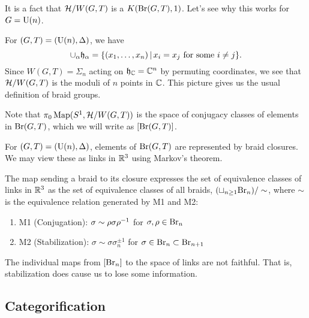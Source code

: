 It is a fact that $\mathcal{H} / W(G, T)$ is a $K(\mathrm{Br}(G, T), 1)$.
Let's see why this works for $G = \mathrm{U}(n)$.

\begin{ex}
	For $(G, T) = (\mathrm{U}(n), \Delta)$, we have
	\[
		\cup_\alpha \mathfrak{h}_\alpha = \{ (x_1, \dots, x_n ) \, | \, x_i = x_j \textrm{ for some } i \neq j \}.
	\]
	Since $W(G, T) = \Sigma_n$ acting on $\mathfrak{h}_{\mathbb{C}} = \mathbb{C}^n$ by permuting coordinates, we see that $\mathcal{H} / W(G, T)$ is the moduli of $n$ points in $\mathbb{C}$.
	This picture gives us the usual definition of braid groups.
\end{ex}

Note that $\pi_0 \operatorname{Map}(S^1, \mathcal{H} / W(G, T))$ is the space of conjugacy classes of elements in $\mathrm{Br}(G, T)$, which we will write as $[\mathrm{Br}(G, T)]$.

\begin{ex}
	For $(G, T) = (\mathrm{U}(n), \Delta)$, elements of $\mathrm{Br}(G, T)$ are represented by braid closures.
	We may view these as links in $\mathbb{R}^3$ using Markov's theorem.
\end{ex}

\begin{thm}[Markov]
	The map sending a braid to its closure expresses the set of equivalence classes of links in $\mathbb{R}^3$ as the set of equivalence classes of all braids, $(\sqcup_{n \geq 1} \mathrm{Br}_n) / \sim$, where $\sim$ is the equivalence relation generated by M1 and M2:
	\begin{enumerate}
		\item M1 (Conjugation): $\sigma \sim \rho \sigma \rho^{-1}$ for $\sigma, \rho \in \mathrm{Br}_n$
		\item M2 (Stabilization): $\sigma \sim \sigma \sigma_n^{\pm 1}$ for $\sigma \in \mathrm{Br}_n \subset \mathrm{Br}_{n+1}$
	\end{enumerate}
\end{thm}

The individual maps from $[\mathrm{Br}_n]$ to the space of links are not faithful.
That is, stabilization does cause us to lose some information.

\subsection{Categorification}

